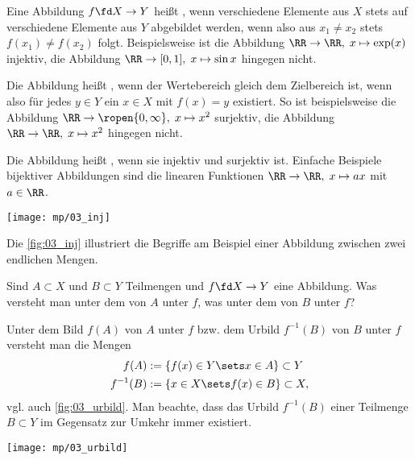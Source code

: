 \begin{antwort}
  Eine Abbildung $f\fd X\to Y$ heißt , wenn 
  verschiedene Elemente aus $X$ stets auf verschiedene 
  Elemente aus $Y$ abgebildet werden, wenn also aus 
  $x_1\not=x_2$ stets $f(x_1)\not= f(x_2)$ folgt. 
  Beispielsweise ist die Abbildung $\RR\to\RR,\; x\mapsto \exp(x)$ 
  injektiv, die Abbildung $\RR\to[0,1],\; x\mapsto\sin x$ 
  hingegen nicht.  

  Die Abbildung heißt , wenn der Wertebereich gleich 
  dem Zielbereich ist, wenn also für jedes $y\in Y$ ein $x\in X$
  mit $f(x)=y$ existiert. So ist beispielsweise die Abbildung 
  $\RR\to \ropen{0,\infty},\; x\mapsto x^2$ surjektiv, die Abbildung 
  $\RR\to\RR,\; x\mapsto x^2$ hingegen nicht.

  Die Abbildung heißt , wenn sie injektiv und 
  surjektiv ist. Einfache Beispiele bijektiver 
  Abbildungen sind die linearen Funktionen 
  $\RR\to\RR,\; x\mapsto ax$ mit $a\in\RR$.
  \begin{center}
    \texttt{[image: mp/03\_inj]}
    \label{fig:03_inj}
  \end{center}
  Die \Abb\ref{fig:03_inj} illustriert die Begriffe am Beispiel einer Abbildung 
  zwischen zwei endlichen Mengen.
  \AntEnd
\end{antwort}

\begin{frage}
  \label{03_urb}
  Sind $A\subset X$ und $B\subset Y$ Teilmengen und $f\fd X\to Y$ eine 
  Abbildung. Was versteht man unter dem  von $A$ unter $f$, 
  was unter dem  von $B$ unter $f$?
\end{frage}

\begin{antwort}
  Unter dem Bild $f(A)$ von $A$ unter $f$ bzw. dem Urbild $f^{-1}(B)$ 
  von $B$ unter $f$ versteht man die Mengen 
  \begin{align*}
    f(A) &:= \{ f(x) \in Y\sets x\in A \} \subset Y  \\
    f^{-1}(B) &:= \{ x\in X\sets f(x)\in B \} \subset X, 
  \end{align*}
  vgl. auch \Abb\ref{fig:03_urbild}.
  Man beachte, dass das Urbild $f^{-1}(B)$ einer Teilmenge $B\subset Y$ 
  im Gegensatz zur Umkehr immer existiert. 
  \AntEnd

  \begin{center}
    \texttt{[image: mp/03\_urbild]}
    \label{fig:03_urbild}
  \end{center}
\end{antwort}

